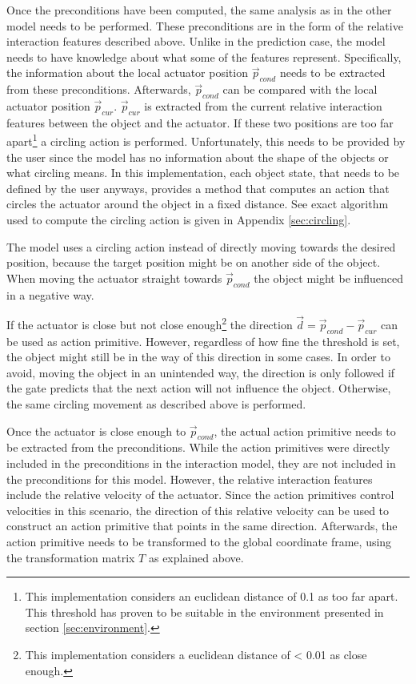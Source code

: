 Once the preconditions have been computed, the same analysis as in the other model needs to be performed. These preconditions are in the form of the relative interaction features described above.
Unlike in the prediction case, the model needs to have knowledge about what some of the features represent. Specifically, the information about the local actuator position $\vec{p}_{cond}$ needs to be extracted from these preconditions. Afterwards, $\vec{p}_{cond}$ can be compared with the local actuator position $\vec{p}_{cur}$. $\vec{p}_{cur}$ is extracted from the current relative interaction features between the object and the actuator. 
If these two positions are too far apart\footnote{This implementation considers an euclidean distance of 0.1 as too far apart. This threshold has proven to be suitable in the environment presented in section \ref{sec:environment}.} a circling action is performed. Unfortunately, this needs to be provided by the user since the model has no information about the shape of the objects or what circling means. In this implementation, each object state, that needs to be defined by the user anyways, provides a method that computes an action that circles the actuator around the object in a fixed distance.
See exact algorithm used to compute the circling action is given in Appendix \ref{sec:circling}.

The model uses a circling action instead of directly moving towards the desired position, because the target position might be on another side of the object. When moving the actuator straight towards $\vec{p}_{cond}$ the object might be influenced in a negative way.

If the actuator is close but not close enough\footnote{This implementation considers a euclidean distance of < 0.01 as close enough.} the direction $\vec{d} = \vec{p}_{cond} - \vec{p}_{cur}$ can be used as action primitive.
However, regardless of how fine the threshold is set, the object might still be in the way of this direction in some cases. In order to avoid, moving the object in an unintended way, the direction is only followed if the gate predicts that the next action will not influence the object. Otherwise, the same circling movement as described above is performed.

Once the actuator is close enough to $\vec{p}_{cond}$, the actual action primitive needs to be extracted from the preconditions. 
While the action primitives were directly included in the preconditions in the interaction model, they are not included in the preconditions for this model. 
However, the relative interaction features include the relative velocity of the actuator. 
Since the action primitives control velocities in this scenario, the direction of this relative velocity can be used to construct an action primitive that points in the same direction. Afterwards, the action primitive needs to be transformed to the global coordinate frame, using the transformation matrix $T$ as explained above.

